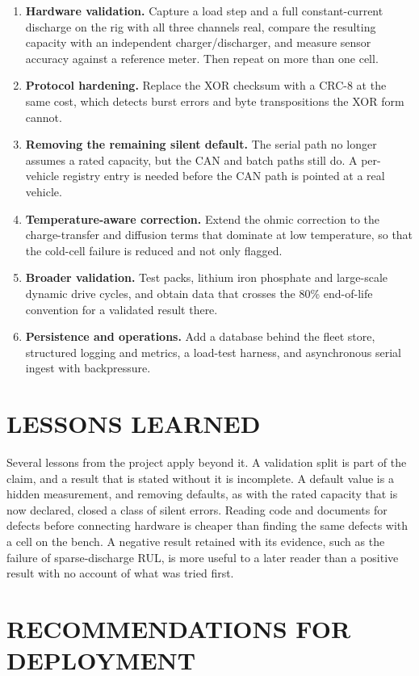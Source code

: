 \documentclass[12pt,a4paper]{amritareport}
\begin{document}
\begin{enumerate}
    \item \textbf{Hardware validation.} Capture a load step and a full constant-current discharge on the rig with all three channels real, compare the resulting capacity with an independent charger/discharger, and measure sensor accuracy against a reference meter. Then repeat on more than one cell.
    \item \textbf{Protocol hardening.} Replace the XOR checksum with a CRC-8 at the same cost, which detects burst errors and byte transpositions the XOR form cannot.
    \item \textbf{Removing the remaining silent default.} The serial path no longer assumes a rated capacity, but the CAN and batch paths still do. A per-vehicle registry entry is needed before the CAN path is pointed at a real vehicle.
    \item \textbf{Temperature-aware correction.} Extend the ohmic correction to the charge-transfer and diffusion terms that dominate at low temperature, so that the cold-cell failure is reduced and not only flagged.
    \item \textbf{Broader validation.} Test packs, lithium iron phosphate and large-scale dynamic drive cycles, and obtain data that crosses the 80\% end-of-life convention for a validated result there.
    \item \textbf{Persistence and operations.} Add a database behind the fleet store, structured logging and metrics, a load-test harness, and asynchronous serial ingest with backpressure.
\end{enumerate}

\section{LESSONS LEARNED}

Several lessons from the project apply beyond it. A validation split is part of the claim, and a result that is stated without it is incomplete. A default value is a hidden measurement, and removing defaults, as with the rated capacity that is now declared, closed a class of silent errors. Reading code and documents for defects before connecting hardware is cheaper than finding the same defects with a cell on the bench. A negative result retained with its evidence, such as the failure of sparse-discharge RUL, is more useful to a later reader than a positive result with no account of what was tried first.

\section{RECOMMENDATIONS FOR DEPLOYMENT}
\end{document}
